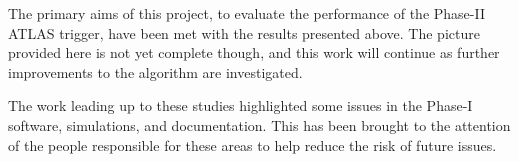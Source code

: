 The primary aims of this project, to evaluate the performance of
the Phase-II ATLAS trigger, have been met with the \eratio results
presented above. The picture provided here is not yet complete though,
and this work will continue as further improvements to the algorithm
are investigated.

The work leading up to these studies highlighted some issues in the
Phase-I software, simulations, and documentation. This has been
brought to the attention of the people responsible for these areas
to help reduce the risk of future issues.

